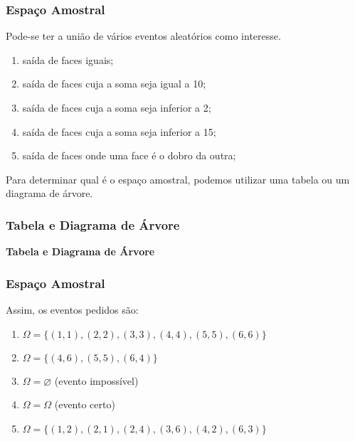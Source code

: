 \documentclass[hyperref={pdfpagelabels=false}]{beamer}
\begin{document}
\begin{frame}
\frametitle{Espaço Amostral}

Pode-se ter a união de vários eventos aleatórios como interesse.

\pause
\begin{enumerate}
	\item saída de faces iguais;
	\pause
	\item saída de faces cuja a soma seja igual a 10;
	\pause
	\item saída de faces cuja a soma seja inferior a 2;
	\pause
	\item saída de faces cuja a soma seja inferior a 15;
	\pause
	\item saída de faces onde uma  face é o dobro da outra;
\end{enumerate}

\pause
Para determinar qual é o espaço amostral, podemos utilizar uma tabela ou um diagrama de árvore.
\end{frame}

\begin{frame}
\frametitle{Tabela e Diagrama de Árvore}

{\bf Tabela e Diagrama de Árvore}
\end{frame}

\begin{frame}
\frametitle{Espaço Amostral}

Assim, os eventos pedidos são:
\begin{enumerate}
	\pause
	\item $\Omega = \{ (1,1), (2,2), (3,3), (4,4), (5,5), (6,6) \}$
	\pause
	\item $\Omega = \{ (4,6), (5,5), (6,4) \}$
	\pause
	\item $\Omega = \varnothing$ (evento impossível)
	\pause
	\item $\Omega = \Omega$ (evento certo)
	\pause
	\item $\Omega = \{ (1,2), (2,1), (2,4), (3,6), (4,2), (6,3) \}$
\end{enumerate}

\end{frame}
\end{document}
